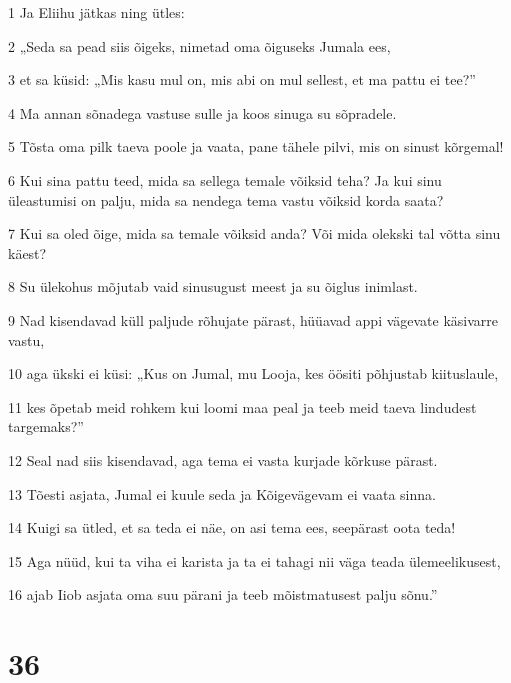 \par 1 Ja Eliihu jätkas ning ütles:
\par 2 „Seda sa pead siis õigeks, nimetad oma õiguseks Jumala ees,
\par 3 et sa küsid: „Mis kasu mul on, mis abi on mul sellest, et ma pattu ei tee?”
\par 4 Ma annan sõnadega vastuse sulle ja koos sinuga su sõpradele.
\par 5 Tõsta oma pilk taeva poole ja vaata, pane tähele pilvi, mis on sinust kõrgemal!
\par 6 Kui sina pattu teed, mida sa sellega temale võiksid teha? Ja kui sinu üleastumisi on palju, mida sa nendega tema vastu võiksid korda saata?
\par 7 Kui sa oled õige, mida sa temale võiksid anda? Või mida olekski tal võtta sinu käest?
\par 8 Su ülekohus mõjutab vaid sinusugust meest ja su õiglus inimlast.
\par 9 Nad kisendavad küll paljude rõhujate pärast, hüüavad appi vägevate käsivarre vastu,
\par 10 aga ükski ei küsi: „Kus on Jumal, mu Looja, kes öösiti põhjustab kiituslaule,
\par 11 kes õpetab meid rohkem kui loomi maa peal ja teeb meid taeva lindudest targemaks?”
\par 12 Seal nad siis kisendavad, aga tema ei vasta kurjade kõrkuse pärast.
\par 13 Tõesti asjata, Jumal ei kuule seda ja Kõigevägevam ei vaata sinna.
\par 14 Kuigi sa ütled, et sa teda ei näe, on asi tema ees, seepärast oota teda!
\par 15 Aga nüüd, kui ta viha ei karista ja ta ei tahagi nii väga teada ülemeelikusest,
\par 16 ajab Iiob asjata oma suu pärani ja teeb mõistmatusest palju sõnu.”

\chapter{36}

